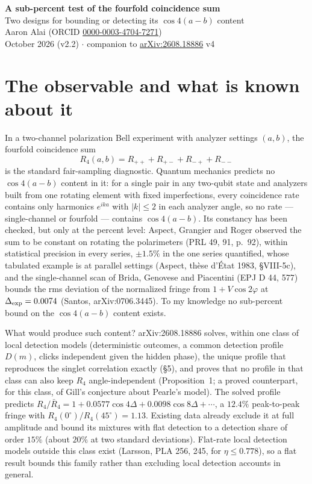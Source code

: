\documentclass[10pt]{article}
\begin{document}
\begin{center}
{\Large\bfseries A sub-percent test of the fourfold coincidence sum}\\[3pt]
{\large Two designs for bounding or detecting its $\cos 4(a-b)$ content}\\[5pt]
Aaron Alai (ORCID \href{https://orcid.org/0000-0003-4704-7271}{0000-0003-4704-7271})\\
October 2026 (v2.2) $\cdot$ companion to \href{https://arxiv.org/abs/2608.18886}{arXiv:2608.18886} v4
\end{center}

\section*{The observable and what is known about it}
In a two-channel polarization Bell experiment with analyzer settings $(a,b)$, the fourfold coincidence sum
\[
R_4(a,b) = R_{++}+R_{+-}+R_{-+}+R_{--}
\]
is the standard fair-sampling diagnostic. Quantum mechanics predicts no $\cos 4(a-b)$ content in it: for a single pair in any two-qubit state and analyzers built from one rotating element with fixed imperfections, every coincidence rate contains only harmonics $e^{ika}$ with $|k|\le 2$ in each analyzer angle, so no rate --- single-channel or fourfold --- contains $\cos 4(a-b)$. Its constancy has been checked, but only at the percent level: Aspect, Grangier and Roger observed the sum to be constant on rotating the polarimeters (PRL 49, 91, p.~92), within statistical precision in every series, $\pm 1.5\%$ in the one series quantified, whose tabulated example is at parallel settings (Aspect, th\`ese d'\'Etat 1983, \S VIII-5c), and the single-channel scan of Brida, Genovese and Piacentini (EPJ D 44, 577) bounds the rms deviation of the normalized fringe from $1+V\cos 2\varphi$ at $\Delta_{\rm exp}=0.0074$ (Santos, arXiv:0706.3445). To my knowledge no sub-percent bound on the $\cos 4(a-b)$ content exists.

What would produce such content? arXiv:2608.18886 solves, within one class of local detection models (deterministic outcomes, a common detection profile $D(m)$, clicks independent given the hidden phase), the unique profile that reproduces the singlet correlation exactly (\S5), and proves that no profile in that class can also keep $R_4$ angle-independent (Proposition~1; a proved counterpart, for this class, of Gill's conjecture about Pearle's model). The solved profile predicts $R_4/\bar R_4 = 1 + 0.0577\cos 4\Delta + 0.0098\cos 8\Delta + \cdots$, a $12.4\%$ peak-to-peak fringe with $R_4(0^\circ)/R_4(45^\circ)=1.13$. Existing data already exclude it at full amplitude and bound its mixtures with flat detection to a detection share of order $15\%$ (about $20\%$ at two standard deviations). Flat-rate local detection models outside this class exist (Larsson, PLA 256, 245, for $\eta\le 0.778$), so a flat result bounds this family rather than excluding local detection accounts in general.
\end{document}
